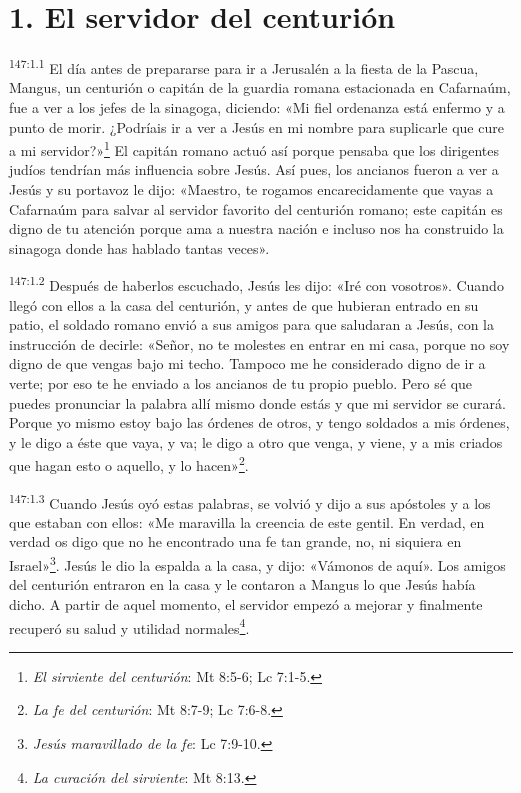 \section*{1. El servidor del centurión}
\par 
\textsuperscript{147:1.1} El día antes de prepararse para ir a Jerusalén a la fiesta de la Pascua, Mangus, un centurión o capitán de la guardia romana estacionada en Cafarnaúm, fue a ver a los jefes de la sinagoga, diciendo: «Mi fiel ordenanza está enfermo y a punto de morir. ¿Podríais ir a ver a Jesús en mi nombre para suplicarle que cure a mi servidor?»\footnote{\textit{El sirviente del centurión}: Mt 8:5-6; Lc 7:1-5.} El capitán romano actuó así porque pensaba que los dirigentes judíos tendrían más influencia sobre Jesús. Así pues, los ancianos fueron a ver a Jesús y su portavoz le dijo: «Maestro, te rogamos encarecidamente que vayas a Cafarnaúm para salvar al servidor favorito del centurión romano; este capitán es digno de tu atención porque ama a nuestra nación e incluso nos ha construido la sinagoga donde has hablado tantas veces».

\par 
\textsuperscript{147:1.2} Después de haberlos escuchado, Jesús les dijo: «Iré con vosotros». Cuando llegó con ellos a la casa del centurión, y antes de que hubieran entrado en su patio, el soldado romano envió a sus amigos para que saludaran a Jesús, con la instrucción de decirle: «Señor, no te molestes en entrar en mi casa, porque no soy digno de que vengas bajo mi techo. Tampoco me he considerado digno de ir a verte; por eso te he enviado a los ancianos de tu propio pueblo. Pero sé que puedes pronunciar la palabra allí mismo donde estás y que mi servidor se curará. Porque yo mismo estoy bajo las órdenes de otros, y tengo soldados a mis órdenes, y le digo a éste que vaya, y va; le digo a otro que venga, y viene, y a mis criados que hagan esto o aquello, y lo hacen»\footnote{\textit{La fe del centurión}: Mt 8:7-9; Lc 7:6-8.}.

\par 
\textsuperscript{147:1.3} Cuando Jesús oyó estas palabras, se volvió y dijo a sus apóstoles y a los que estaban con ellos: «Me maravilla la creencia de este gentil. En verdad, en verdad os digo que no he encontrado una fe tan grande, no, ni siquiera en Israel»\footnote{\textit{Jesús maravillado de la fe}: Lc 7:9-10.}. Jesús le dio la espalda a la casa, y dijo: «Vámonos de aquí». Los amigos del centurión entraron en la casa y le contaron a Mangus lo que Jesús había dicho. A partir de aquel momento, el servidor empezó a mejorar y finalmente recuperó su salud y utilidad normales\footnote{\textit{La curación del sirviente}: Mt 8:13.}.

